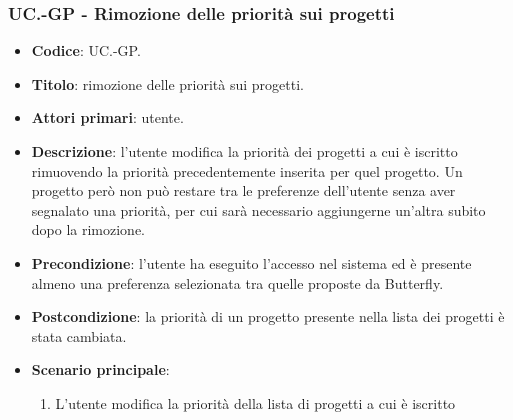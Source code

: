     \subsubsection{UC\theuccount.\thesubuccount-GP - Rimozione delle priorità sui progetti}

    \begin{itemize}
        \item \textbf{Codice}: UC\theuccount.\thesubuccount-GP.
        \item \textbf{Titolo}: rimozione delle priorità sui progetti.
        \item \textbf{Attori primari}: utente.
        \item \textbf{Descrizione}: l'utente modifica la priorità dei progetti a cui è iscritto rimuovendo la priorità precedentemente inserita per quel progetto.
        Un progetto però non può restare tra le preferenze dell'utente senza aver segnalato una priorità, per cui sarà necessario aggiungerne un'altra subito dopo la rimozione.
        \item \textbf{Precondizione}: l’utente ha eseguito l'accesso nel sistema ed è presente almeno
        una preferenza selezionata tra quelle proposte da Butterfly.
        \item \textbf{Postcondizione}: la priorità di un progetto presente nella lista dei progetti è stata cambiata.
        \item \textbf{Scenario principale}:
        \begin{enumerate}
            \item L'utente modifica la priorità della lista di progetti a cui è iscritto
        \end{enumerate}
    \end{itemize}
